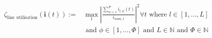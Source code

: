 \begin{equation}
\begin{split}
	\zeta_\text{line utilisation}(\textbf{i}(t)) :=& %
	\max_{l}{\left|\frac{\sum_{\phi=1}^{P}{i_{l,\phi}(t)}}{i_{nom,l}}\right|^2} \forall t \text{ where } l \in [1, \dots, L] \\
	&\text{ and } \phi \in [1, \dots, \Phi] \text{ and } L \in \mathbb{N} \text{ and } \Phi \in \mathbb{N}
\end{split}
\label{ch1:equ:line-utilisation}
\end{equation}